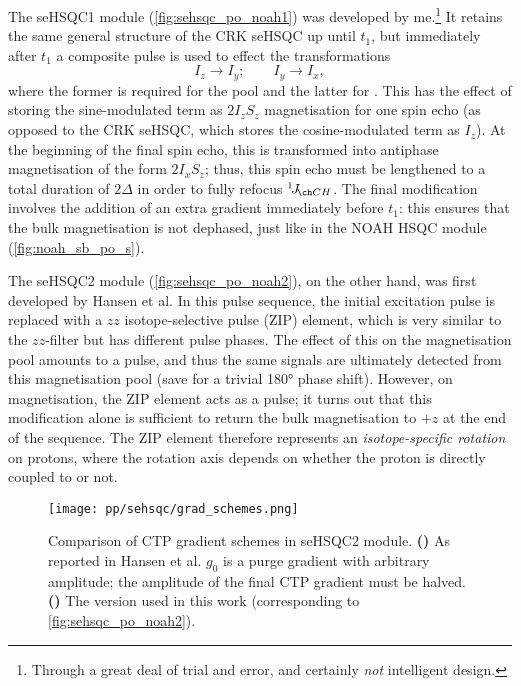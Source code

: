The seHSQC1 module (\cref{fig:sehsqc_po_noah1}) was developed by me.\footnote{Through a great deal of trial and error, and certainly \textit{not} intelligent design.}
It retains the same general structure of the CRK seHSQC up until $t_1$, but immediately after $t_1$ a composite \proton{} pulse is used to effect the transformations
\begin{equation}
    \label{eq:sehsqc1_dp}
    I_z \to I_y; \qquad I_y \to I_x,
\end{equation}
where the former is required for the  pool and the latter for .
This has the effect of storing the sine-modulated term as $2I_zS_z$ magnetisation for one spin echo (as opposed to the CRK seHSQC, which stores the cosine-modulated term as $I_z$).
At the beginning of the final spin echo, this is transformed into antiphase magnetisation of the form $2I_xS_z$; thus, this spin echo must be lengthened to a total duration of $2\Delta$ in order to fully refocus $\oneJ{CH}$.
The final modification involves the addition of an extra gradient immediately before $t_1$: this ensures that the bulk  magnetisation is not dephased, just like in the NOAH HSQC module (\cref{fig:noah_sb_po_s}).

The seHSQC2 module (\cref{fig:sehsqc_po_noah2}), on the other hand, was first developed by Hansen et al.\autocite{Hansen2021AC}
In this pulse sequence, the initial \proton{}  excitation pulse is replaced with a $zz$ isotope-selective pulse (ZIP) element, which is very similar to the $zz$-filter but has different pulse phases.
The effect of this on the  magnetisation pool amounts to a  pulse, and thus the same signals are ultimately detected from this magnetisation pool (save for a trivial \ang{180} phase shift).
However, on  magnetisation, the ZIP element acts as a  pulse; it turns out that this modification alone is sufficient to return the bulk  magnetisation to $+z$ at the end of the sequence.
The ZIP element therefore represents an \textit{isotope-specific rotation} on protons, where the rotation axis depends on whether the proton is directly coupled to \carbon{} or not.

\begin{figure}[!ht]
    \centering
    \texttt{[image: pp/sehsqc/grad\_schemes.png]}%
    {\label{fig:sehsqc_grad_schemes_alex}}%
    {\label{fig:sehsqc_grad_schemes_jon}}%
    \caption[Comparison of gradient schemes in seHSQC2 module]{
        Comparison of CTP gradient schemes in seHSQC2 module.
        \textbf{()} As reported in Hansen et al.\autocite{Hansen2021AC} $g_0$ is a purge gradient with arbitrary amplitude; the amplitude of the final CTP gradient must be halved.
        \textbf{()} The version used in this work (corresponding to \cref{fig:sehsqc_po_noah2}).
    }
    \label{fig:sehsqc_grad_schemes}
\end{figure}

